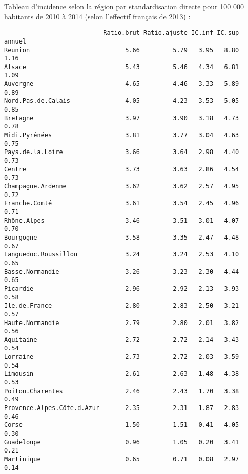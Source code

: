 \documentclass[11pt,a4paper]{article}\usepackage[]{graphicx}\usepackage[]{color}
\makeatletter
\newenvironment{kframe}{%
 \def\at@end@of@kframe{}%
 \ifinner\ifhmode%
  \def\at@end@of@kframe{\end{minipage}}%
  \begin{minipage}{\columnwidth}%
 \fi\fi%
 \def\FrameCommand##1{\hskip\@totalleftmargin \hskip-\fboxsep
 \colorbox{shadecolor}{##1}\hskip-\fboxsep
     \hskip-\linewidth \hskip-\@totalleftmargin \hskip\columnwidth}%
 \MakeFramed {\advance\hsize-\width
   \@totalleftmargin\z@ \linewidth\hsize
   \@setminipage}}%
 {\par\unskip\endMakeFramed%
 \at@end@of@kframe}
\newenvironment{knitrout}{}{} %
\makeatother
\begin{document}
Tableau d'incidence selon la région par standardisation directe pour 100 000 habitants de 2010 à 2014 (selon l'effectif français de 2013) :
\begin{knitrout}
\color{fgcolor}\begin{kframe}
\begin{verbatim}
                           Ratio.brut Ratio.ajuste IC.inf IC.sup annuel
Reunion                          5.66         5.79   3.95   8.80   1.16
Alsace                           5.43         5.46   4.34   6.81   1.09
Auvergne                         4.65         4.46   3.33   5.89   0.89
Nord.Pas.de.Calais               4.05         4.23   3.53   5.05   0.85
Bretagne                         3.97         3.90   3.18   4.73   0.78
Midi.Pyrénées                    3.81         3.77   3.04   4.63   0.75
Pays.de.la.Loire                 3.66         3.64   2.98   4.40   0.73
Centre                           3.73         3.63   2.86   4.54   0.73
Champagne.Ardenne                3.62         3.62   2.57   4.95   0.72
Franche.Comté                    3.61         3.54   2.45   4.96   0.71
Rhône.Alpes                      3.46         3.51   3.01   4.07   0.70
Bourgogne                        3.58         3.35   2.47   4.48   0.67
Languedoc.Roussillon             3.24         3.24   2.53   4.10   0.65
Basse.Normandie                  3.26         3.23   2.30   4.44   0.65
Picardie                         2.96         2.92   2.13   3.93   0.58
Ile.de.France                    2.80         2.83   2.50   3.21   0.57
Haute.Normandie                  2.79         2.80   2.01   3.82   0.56
Aquitaine                        2.72         2.72   2.14   3.43   0.54
Lorraine                         2.73         2.72   2.03   3.59   0.54
Limousin                         2.61         2.63   1.48   4.38   0.53
Poitou.Charentes                 2.46         2.43   1.70   3.38   0.49
Provence.Alpes.Côte.d.Azur       2.35         2.31   1.87   2.83   0.46
Corse                            1.50         1.51   0.41   4.05   0.30
Guadeloupe                       0.96         1.05   0.20   3.41   0.21
Martinique                       0.65         0.71   0.08   2.97   0.14
\end{verbatim}
\end{kframe}
\end{knitrout}
\end{document}
